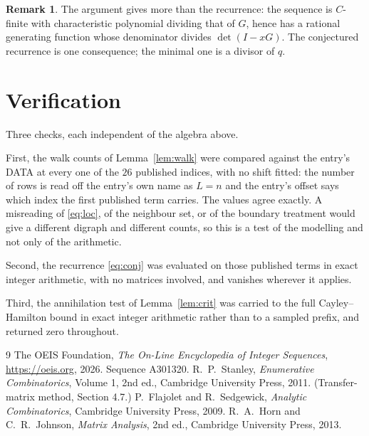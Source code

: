 \documentclass[11pt,a4paper]{article}
\theoremstyle{plain}
\theoremstyle{definition}
\newtheorem{remark}[theorem]{Remark}
\begin{document}
\begin{remark}
The argument gives more than the recurrence: the sequence is $C$-finite with characteristic
polynomial dividing that of $G$, hence has a rational generating function whose denominator
divides $\det(I-xG)$. The conjectured recurrence is one consequence; the minimal one is a
divisor of $q$.
\end{remark}

\section{Verification}

Three checks, each independent of the algebra above.

First, the walk counts of Lemma~\ref{lem:walk} were compared against the entry's DATA at
every one of the $26$ published indices, with no shift fitted: the number of rows is
read off the entry's own name as $L=n$ and the entry's offset says which index the first
published term carries. The values agree exactly. A misreading of \eqref{eq:loc}, of the
neighbour set, or of the boundary treatment would give a different digraph and different
counts, so this is a test of the modelling and not only of the arithmetic.

Second, the recurrence \eqref{eq:conj} was evaluated on those published terms in exact
integer arithmetic, with no matrices involved, and vanishes wherever it applies.

Third, the annihilation test of Lemma~\ref{lem:crit} was carried to the full
Cayley--Hamilton bound in exact integer arithmetic rather than to a sampled prefix, and
returned zero throughout.

\begin{thebibliography}{9}
 The OEIS Foundation, \emph{The On-Line Encyclopedia of Integer
Sequences}, \url{https://oeis.org}, 2026. Sequence A301320.
 R.~P.~Stanley, \emph{Enumerative Combinatorics}, Volume 1, 2nd ed.,
Cambridge University Press, 2011. (Transfer-matrix method, Section 4.7.)
 P.~Flajolet and R.~Sedgewick, \emph{Analytic Combinatorics}, Cambridge
University Press, 2009.
 R.~A.~Horn and C.~R.~Johnson, \emph{Matrix Analysis}, 2nd ed., Cambridge
University Press, 2013.
\end{thebibliography}
\end{document}
